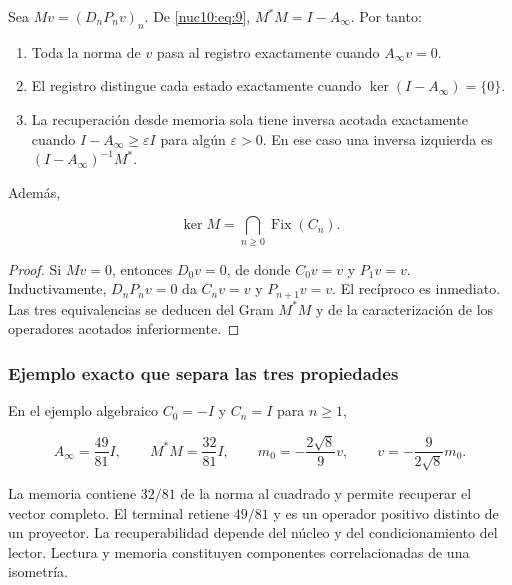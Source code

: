 Sea \(Mv=(D_nP_nv)_n\). De \eqref{nuc10:eq:9}, \(M^*M=I-A_\infty\). Por tanto:

\begin{enumerate}
\item Toda la norma de \(v\) pasa al registro exactamente cuando \(A_\infty v=0\).
\item El registro distingue cada estado exactamente cuando \(\ker(I-A_\infty)=\{0\}\).
\item La recuperación desde memoria sola tiene inversa acotada exactamente cuando
\(I-A_\infty\geq\varepsilon I\) para algún \(\varepsilon>0\).
En ese caso una inversa izquierda es \((I-A_\infty)^{-1}M^*\).
\end{enumerate}

Además,



\begin{equation}
\boxed{\ker M=\bigcap_{n\ge0}\operatorname{Fix}(C_n).}
\label{nuc10:eq:12}
\end{equation}



\begin{proof}
Si \(Mv=0\), entonces \(D_0v=0\), de donde \(C_0v=v\)
y \(P_1v=v\). Inductivamente, \(D_nP_nv=0\) da \(C_nv=v\) y
\(P_{n+1}v=v\). El recíproco es inmediato. Las tres equivalencias se
deducen del Gram \(M^*M\) y de la caracterización de los operadores
acotados inferiormente.
\end{proof}

\subsubsection{Ejemplo exacto que separa las tres propiedades}

En el ejemplo algebraico \(C_0=-I\) y \(C_n=I\) para \(n\geq1\),



\begin{equation}
A_\infty=\frac{49}{81}I,\qquad M^*M=\frac{32}{81}I,
\qquad m_0=-\frac{2\sqrt8}{9}v,
\qquad v=-\frac9{2\sqrt8}m_0.
\label{nuc10:eq:13}
\end{equation}



La memoria contiene \(32/81\) de la norma al cuadrado y permite recuperar el vector completo. El terminal retiene \(49/81\) y es un operador positivo distinto de un proyector. La recuperabilidad depende del núcleo y del condicionamiento del lector. Lectura y memoria constituyen componentes correlacionadas de una isometría.

